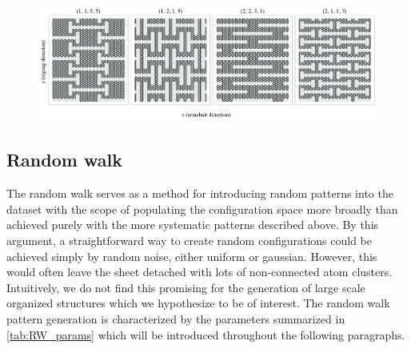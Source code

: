 \begin{figure}[H]
  \centering
  \includegraphics[width=\linewidth]{figures/system/honeycomb_flavors.pdf}
  \caption{}
  \label{fig:honeycomb_flavors}
\end{figure}




\subsection{Random walk}
The random walk serves as a method for introducing random patterns into the dataset with the scope of populating the configuration space more broadly than achieved purely with the more systematic patterns described above. By this argument, a straightforward way to create random configurations could be achieved simply by random noise, either uniform or gaussian. However, this would often leave the sheet detached with lots of non-connected atom clusters. Intuitively, we do not find this promising for the generation of large scale organized structures which we hypothesize to be of interest. The random walk pattern generation is characterized by the parameters summarized in \cref{tab:RW_params} which will be introduced throughout the following paragraphs. 

